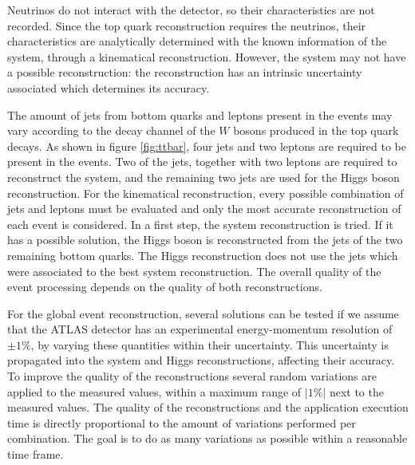 Neutrinos do not interact with the detector, so their characteristics are not recorded. Since the top quark reconstruction requires the neutrinos, their characteristics are analytically determined with the known information of the system, through a kinematical reconstruction. However, the \ttbar system may not have a possible reconstruction: the reconstruction has an intrinsic uncertainty associated which determines its accuracy.

The amount of jets from bottom quarks and leptons present in the events may vary according to the decay channel of the $W$ bosons produced in the top quark decays. As shown in figure \ref{fig:ttbar}, four jets and two leptons are required to be present in the events. Two of the jets, together with two leptons are required to reconstruct the \ttbar system, and the remaining two jets are used for the Higgs boson reconstruction. For the kinematical reconstruction, every possible combination of jets and leptons must be evaluated and only the most accurate reconstruction of each event is considered. In a first step, the \ttbar system reconstruction is tried.  If it has a possible solution, the Higgs boson is reconstructed from the jets of the two remaining bottom quarks. The Higgs reconstruction does not use the jets which were associated to the best \ttbar system reconstruction. The overall quality of the event processing depends on the quality of both reconstructions.

For the global event reconstruction, several solutions can be tested if we assume that the ATLAS detector has an experimental energy-momentum resolution of $\pm1\%$, by varying these quantities within their uncertainty. This uncertainty is propagated into the \ttbar system and Higgs reconstructions, affecting their accuracy. To improve the quality of the reconstructions several random variations are applied to the measured values, within a maximum range of $|1\%|$ next to the measured values. The quality of the reconstructions and the application execution time is directly proportional to the amount of variations performed per combination. The goal is to do as many variations as possible within a reasonable time frame.

